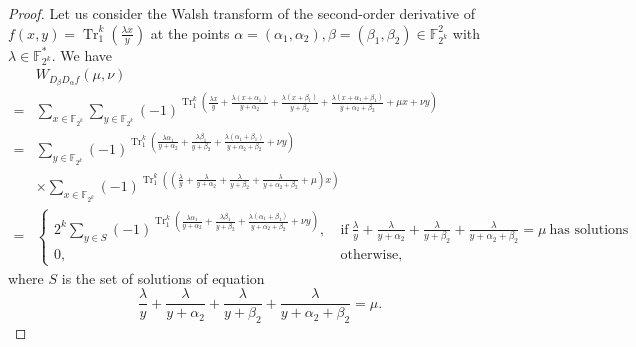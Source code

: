 \documentclass{article}
\newcommand{\F}{\mathbb{F}}
\newcommand{\0}{\textbf{0}}
\newcommand{\1}{\textbf{1}}
\newcommand{\TRACE}{\operatorname{Tr}_1^k}
\theoremstyle{plain}
\theoremstyle{nonumberplain}
\begin{document}
    \begin{proof}        
    Let us consider the Walsh transform of the second-order derivative of 
    $ f(x,y)=\TRACE\left(\frac{\lambda x}{y}\right) $ at the points 
    $ \alpha=(\alpha_1,\alpha_2),\beta=(\beta_1,\beta_2)\in\F_{2^k}^2 $ with $ \lambda\in\F_{2^k}^* $.
    We have 
    \begin{align}\label{eq:secondordersum}
        &W_{D_{\beta}D_{\alpha}f}(\mu,\nu)\nonumber\\
        =&\sum_{x\in\F_{2^k}}\sum_{y\in\F_{2^k}}(-1)^{\TRACE\left(\frac{\lambda x}{y}+\frac{\lambda (x+\alpha_1)}{y+\alpha_2}+\frac{\lambda (x+\beta_1)}{y+\beta_2}+\frac{\lambda (x+\alpha_1+\beta_1)}{y+\alpha_2+\beta_2}+\mu x+\nu y\right)}\nonumber\\
        =&\sum_{y\in\F_{2^k}}(-1)^{\TRACE\left(\frac{\lambda\alpha_1}{y+\alpha_2}+\frac{\lambda\beta_1}{y+\beta_2}+\frac{\lambda(\alpha_1+\beta_1)}{y+\alpha_2+\beta_2}+\nu y\right)}\nonumber\\
        &\times \sum_{x\in\F_{2^k}}(-1)^{\TRACE\left(\left(\frac{\lambda}{y}+\frac{\lambda}{y+\alpha_2}+\frac{\lambda}{y+\beta_2}+\frac{\lambda}{y+\alpha_2+\beta_2}+\mu\right)x\right)}\nonumber\\
        =&\begin{cases}
            2^k\sum_{y\in S}(-1)^{\TRACE\left(\frac{\lambda\alpha_1}{y+\alpha_2}+\frac{\lambda\beta_1}{y+\beta_2}+\frac{\lambda(\alpha_1+\beta_1)}{y+\alpha_2+\beta_2}+\nu y\right)},&~\text{if}~\frac{\lambda}{y}+\frac{\lambda}{y+\alpha_2}+\frac{\lambda}{y+\beta_2}+\frac{\lambda}{y+\alpha_2+\beta_2}=\mu~\text{has solutions}\\
            0, &~\text{otherwise}, 
        \end{cases}
    \end{align}
    where $ S $ is the set of solutions of equation 
    \begin{equation}\label{eq:coefficient}
        \frac{\lambda}{y}+\frac{\lambda}{y+\alpha_2}+\frac{\lambda}{y+\beta_2}+\frac{\lambda}{y+\alpha_2+\beta_2}=\mu.
    \end{equation}


\end{proof}
\end{document}
